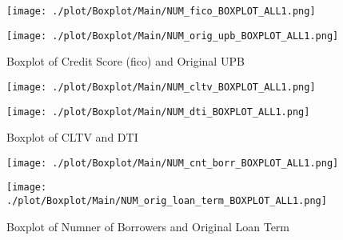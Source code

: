 \begin{figure}[H]
\begin{minipage}{.5\textwidth}
	\centering
	\texttt{[image: ./plot/Boxplot/Main/NUM\_fico\_BOXPLOT\_ALL1.png]}
\end{minipage}%
\begin{minipage}{.5\textwidth}
	\centering
	\texttt{[image: ./plot/Boxplot/Main/NUM\_orig\_upb\_BOXPLOT\_ALL1.png]}
\end{minipage}
    \caption{Boxplot of Credit Score (fico) and Original UPB}
    \label{fig:re_boxpl_fico_origupb}
\end{figure}
\begin{figure}[H]
\begin{minipage}{.5\textwidth}
	\centering
	\texttt{[image: ./plot/Boxplot/Main/NUM\_cltv\_BOXPLOT\_ALL1.png]}
\end{minipage}%
\begin{minipage}{.5\textwidth}
	\centering
	\texttt{[image: ./plot/Boxplot/Main/NUM\_dti\_BOXPLOT\_ALL1.png]}
\end{minipage}
    \caption{Boxplot of CLTV and DTI}
\end{figure}
\begin{figure}[H]
\begin{minipage}{.5\textwidth}
	\centering
	\texttt{[image: ./plot/Boxplot/Main/NUM\_cnt\_borr\_BOXPLOT\_ALL1.png]}
\end{minipage}%
\begin{minipage}{.5\textwidth}
	\centering
	\texttt{[image: ./plot/Boxplot/Main/NUM\_orig\_loan\_term\_BOXPLOT\_ALL1.png]}
\end{minipage}
    \caption{Boxplot of Numner of Borrowers and Original Loan Term}
    \label{fig:re_boxpl_noborr_loanterm}
\end{figure}


